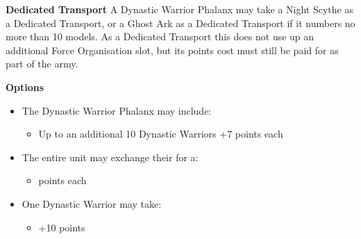 \begin{minipage}[t]{0.72\textwidth}
	\vspace*{2em}
	\textbf{Dedicated Transport}
	A Dynastic Warrior Phalanx may take a Night Scythe as a Dedicated Transport, or a Ghost Ark as a Dedicated Transport if it numbers no more than 10 models. As a Dedicated Transport this does not use up an additional Force Organisation slot, but its points cost must still be paid for as part of the army.

	\vspace*{2em}
	\textbf{Options}
	\begin{itemize}
		\item The Dynastic Warrior Phalanx may include:
		\begin{itemize}
			\item Up to an additional 10 Dynastic Warriors \dotfill +7 points each
		\end{itemize}
		\item The entire unit may exchange their  for a:
		\begin{itemize}
			\item {}  points each
		\end{itemize}
		\item One Dynastic Warrior may take:
		\begin{itemize}
			\item {} \dotfill +10 points
		\end{itemize} 
	\end{itemize}
\end{minipage}


\newpage
